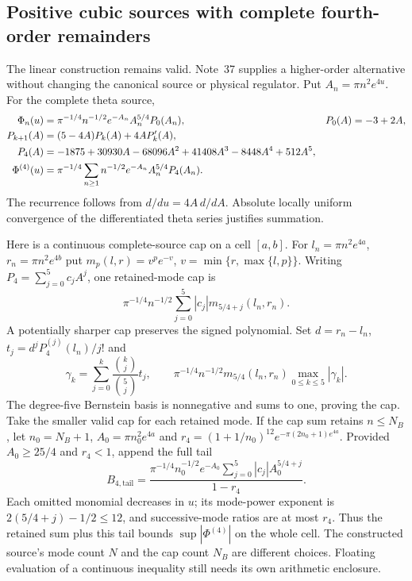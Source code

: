 \subsection{Positive cubic sources with complete fourth-order remainders}
\label{sec:hermite-source}
The linear construction remains valid. Note~37 \cite{n37} supplies a
higher-order alternative without changing the canonical source or physical
regulator. Put $A_n=\pi n^2e^{4u}$. For the complete theta source,
\begin{align}
 \Phi_n(u)&=\pi^{-1/4}n^{-1/2}e^{-A_n}A_n^{5/4}P_0(A_n),
 &P_0(A)&=-3+2A,\notag\\
 P_{k+1}(A)&=(5-4A)P_k(A)+4AP_k'(A),\notag\\
 P_4(A)&=-1875+30930A-68096A^2+41408A^3-8448A^4+512A^5,\notag\\
 \Phi^{(4)}(u)&=\pi^{-1/4}\sum_{n\ge1}n^{-1/2}e^{-A_n}A_n^{5/4}P_4(A_n).
 \label{eq:hermite-p4}
\end{align}
The recurrence follows from $d/du=4A\,d/dA$. Absolute locally uniform
convergence of the differentiated theta series justifies summation.

Here is a continuous complete-source cap on a cell $[a,b]$. For
$l_n=\pi n^2e^{4a}$, $r_n=\pi n^2e^{4b}$ put
$m_p(l,r)=v^pe^{-v}$, $v=\min\{r,\max\{l,p\}\}$.
Writing $P_4=\sum_{j=0}^5c_jA^j$, one retained-mode cap is
\[
 \pi^{-1/4}n^{-1/2}\sum_{j=0}^5|c_j|m_{5/4+j}(l_n,r_n).
\]
A potentially sharper cap preserves the signed polynomial. Set
$d=r_n-l_n$, $t_j=d^jP_4^{(j)}(l_n)/j!$ and
\begin{equation}
 \gamma_k=\sum_{j=0}^k\frac{\binom{k}{j}}{\binom{5}{j}}t_j,
 \qquad
 \pi^{-1/4}n^{-1/2}m_{5/4}(l_n,r_n)\max_{0\le k\le5}|\gamma_k|.
 \label{eq:hermite-bernstein-cap}
\end{equation}
The degree-five Bernstein basis is nonnegative and sums to one, proving
the cap. Take the smaller valid cap for each retained mode.
If the cap sum retains $n\le N_B$, let $n_0=N_B+1$,
$A_0=\pi n_0^2e^{4a}$ and
$r_4=(1+1/n_0)^{12}e^{-\pi(2n_0+1)e^{4a}}$. Provided
$A_0\ge25/4$ and $r_4<1$, append the full tail
\begin{equation}
 B_{4,\mathrm{tail}}=
 \frac{\pi^{-1/4}n_0^{-1/2}e^{-A_0}
       \sum_{j=0}^5|c_j|A_0^{5/4+j}}{1-r_4}.
 \label{eq:hermite-cap-tail}
\end{equation}
Each omitted monomial decreases in $u$; its mode-power exponent is
$2(5/4+j)-1/2\le12$, and successive-mode ratios are at most $r_4$.
Thus the retained sum plus this tail bounds $\sup|\Phi^{(4)}|$ on the
whole cell. The constructed source's mode count $N$ and the cap count
$N_B$ are different choices. Floating evaluation of a continuous
inequality still needs its own arithmetic enclosure.

